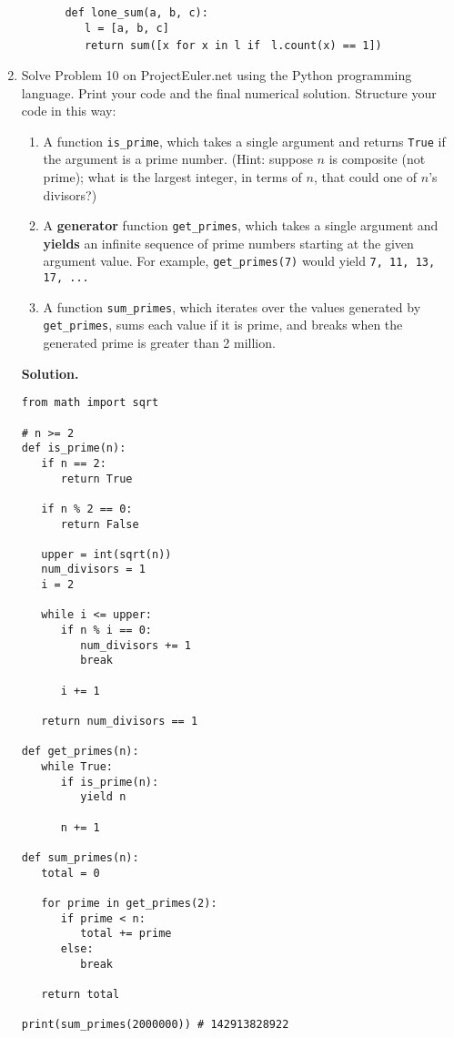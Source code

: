 \documentclass[9pt]{article}
\begin{document}
\begin{enumerate}
\begin{enumerate}
\begin{itemize}
                        \verb|def lone_sum(a, b, c):| \\
                        \verb|   l = [a, b, c]| \\
                        \verb|   return sum([x for x in l if |
                        \verb|l.count(x) == 1])|
               \end{itemize}
      \end{enumerate}
   \item Solve Problem 10 on ProjectEuler.net using the Python programming 
         language. Print your code and the final numerical solution. Structure 
         your code in this way:
         \begin{enumerate}
            \item A function \verb|is_prime|, which takes a single argument and
                  returns \verb|True| if the argument is a prime number. (Hint:
                  suppose $n$ is composite (not prime); what is the largest
                  integer, in terms of $n$, that could one of $n$'s divisors?)
            \item A \textbf{generator} function \verb|get_primes|, which takes a
                  single argument and \textbf{yields} an infinite sequence of
                  prime numbers starting at the given argument value. For
                  example, \verb|get_primes(7)| would yield
                  \verb|7, 11, 13, 17, ...|
            \item A function \verb|sum_primes|, which iterates over the values
                  generated by \verb|get_primes|, sums each value if it is
                  prime, and breaks when the generated prime is greater than 2
                  million.
         \end{enumerate}

      \textbf{Solution.}

      \begin{verbatim}
from math import sqrt

# n >= 2
def is_prime(n):
   if n == 2:
      return True

   if n % 2 == 0:
      return False

   upper = int(sqrt(n))
   num_divisors = 1
   i = 2

   while i <= upper:
      if n % i == 0:
         num_divisors += 1
         break

      i += 1

   return num_divisors == 1

def get_primes(n):
   while True:
      if is_prime(n):
         yield n
      
      n += 1

def sum_primes(n):
   total = 0

   for prime in get_primes(2):
      if prime < n:
         total += prime 
      else:
         break
      
   return total

print(sum_primes(2000000)) # 142913828922
      \end{verbatim}
\end{enumerate}
\end{document}
